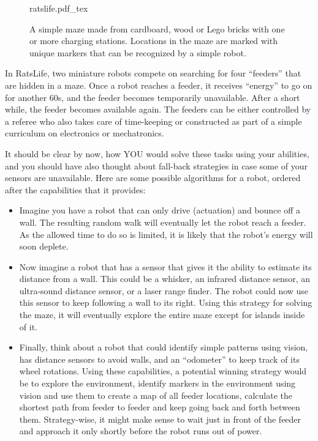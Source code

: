 \begin{figure}
    \centering
    \def\svgwidth{\textwidth}
    {ratslife.pdf_tex}
    \caption{A simple maze made from cardboard, wood or Lego bricks with one or more charging stations. Locations in the maze are marked with unique markers that can be recognized by a simple robot.}
    \label{fig:ratslife}
\end{figure}

In RatsLife, two miniature robots  compete on searching for four ``feeders'' that are hidden in  a maze. Once a robot reaches a feeder, it receives ``energy'' to go on for another 60s, and the feeder becomes temporarily unavailable. After a short while, the feeder becomes available again. The feeders can be either controlled by a referee who also takes care of time-keeping or constructed as part of a simple curriculum on electronics or mechatronics.

It should be clear by now, how YOU would solve these tasks using your abilities, and you should have also thought about fall-back strategies in case some of your sensors are unavailable. Here are some possible algorithms for a robot, ordered after the capabilities that it provides:
\begin{itemize}
\item Imagine you have a robot that can only drive (actuation) and bounce off a wall. The resulting random walk will eventually let the robot reach a feeder. As the allowed time to do so is limited, it is likely that the robot's energy will soon deplete.
\item Now imagine a robot that has a sensor that gives it the ability to estimate its distance from a wall. This could be a whisker, an infrared distance sensor, an ultra-sound distance sensor, or a laser range finder. The robot could now use this sensor to keep following a wall to its right. Using this strategy for solving the maze, it will eventually explore the entire maze except for islands inside of it.
\item Finally, think about a robot that could identify simple patterns using vision, has distance sensors to avoid walls, and an ``odometer'' to keep track of its wheel rotations. Using these capabilities, a potential winning strategy would be to explore the environment, identify markers in the environment using vision and use them to create a map of all feeder locations, calculate the shortest path from feeder to feeder and keep going back and forth between them. Strategy-wise, it might make sense to wait just in front of the feeder and approach it only shortly before the robot runs out of power.
\end{itemize}

